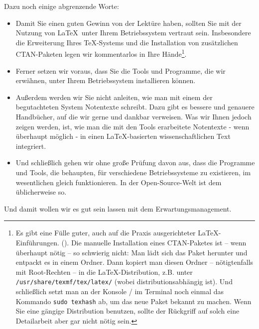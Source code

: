 Dazu noch einige abgrenzende Worte:
\begin{itemize}
  \item Damit Sie einen guten Gewinn von der Lektüre haben, sollten Sie mit der
  Nutzung von \LaTeX\ unter Ihrem Betriebssystem vertraut sein.
  Insbesondere die Erweiterung Ihres \TeX-Systems und die Installation von
  zusätzlichen CTAN-Paketen legen wir kommentarlos in Ihre Hände\footnote{Es
  gibt eine Fülle guter, auch auf die Praxis ausgerichteter \LaTeX-Einführungen.
  (\cite[etwa][7ff]{Schlosser2016a}). Die ma\-nuelle Installation eines
  CTAN-Paketes ist -- wenn überhaupt nötig -- so schwierig nicht: Man lädt sich das
  Paket herunter und entpackt es in einem Ordner. Dann kopiert man diesen Ordner
  -- nötigtenfalls mit Root-Rechten -- in die \LaTeX-Distribution, z.B. unter
  \texttt{/usr/share/texmf/tex/latex/} (wobei 
  distributionsabhängig ist). Und schließlich setzt man an der Konsole / im
  Terminal noch einmal das Kommando \texttt{sudo texhash} ab, um das neue Paket
  bekannt zu machen. Wenn Sie eine gängige Distribution benutzen, sollte der
  Rückgriff auf solch eine Detailarbeit aber gar nicht nötig sein.}.
  \item Ferner setzen wir voraus, dass Sie die Tools und Programme, die wir
  erwähnen, unter Ihrem Betriebssystem installieren können.
  \item Außerdem werden wir Sie nicht anleiten, wie man mit einem der
  begutachteten System Notentexte schreibt. Dazu gibt es bessere und genauere
  Handbücher, auf die wir gerne und dankbar verweisen. Was wir Ihnen jedoch
  zeigen werden, ist, wie man die mit den Tools erarbeitete Notentexte - wenn
  überhaupt möglich - in einen \LaTeX-basierten wissenschaftlichen Text
  integriert.
  \item Und schließlich gehen wir ohne große Prüfung davon aus, dass die
  Programme und Tools, die behaupten, für verschiedene Betriebssysteme zu
  existieren, im wesentlichen gleich funktionieren. In der Open-Source-Welt ist
  dem üblicherweise so.
\end{itemize}

Und damit wollen wir es gut sein lassen mit dem Erwartungsmanagement.



%
